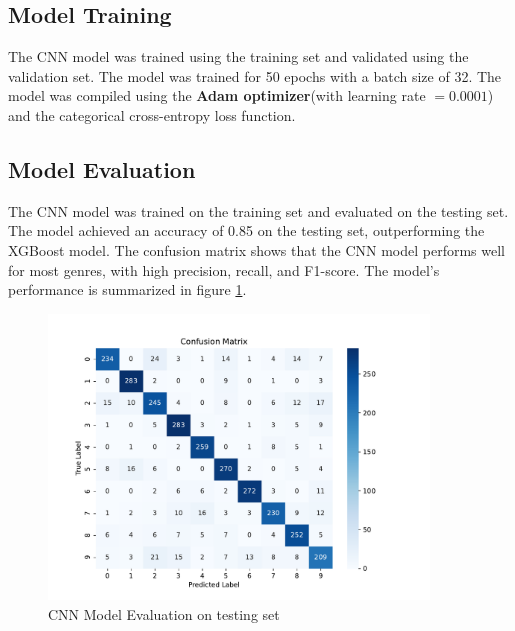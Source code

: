 \documentclass[11.5pt]{article}
\begin{document}
\subsection{Model Training}
The CNN model was trained using the training set and validated using the validation set. The model was trained for 50 epochs with a batch size of 32. The model was compiled using the \textbf{Adam optimizer}(with learning rate $=0.0001$) and the categorical cross-entropy loss function.


\subsection{Model Evaluation}
The CNN model was trained on the training set and evaluated on the testing set. The model achieved an accuracy of 0.85 on the testing set, outperforming the XGBoost model. The confusion matrix shows that the CNN model performs well for most genres, with high precision, recall, and F1-score. The model's performance is summarized in figure \ref{fig:cnn_evaluation}.

\begin{figure}[H]
    \centering
    \includegraphics[width=0.9\textwidth]{graphics/cnn_evaluation.pdf}
    \caption{CNN Model Evaluation on testing set}
    \label{fig:cnn_evaluation}
\end{figure}
\end{document}
